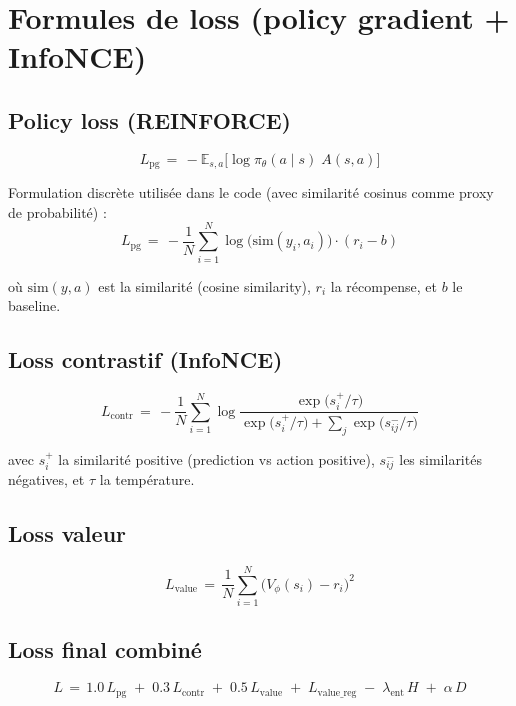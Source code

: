 \documentclass[a4paper,11pt]{article}
\begin{document}
\section*{Formules de loss (policy gradient + InfoNCE)}

\subsection*{Policy loss (REINFORCE)}
\begin{equation}
L_{\text{pg}} \,=\, -\mathbb{E}_{s,a}\big[\log \pi_{\theta}(a\mid s)\; A(s,a)\big]
\end{equation}

Formulation discrète utilisée dans le code (avec similarité cosinus comme proxy de probabilité) :
\begin{equation}
L_{\text{pg}} \,=\, -\frac{1}{N}\sum_{i=1}^{N} \log\big(\mathrm{sim}(y_i,a_i)\big)\cdot (r_i - b)
\end{equation}

où $\mathrm{sim}(y,a)$ est la similarité (cosine similarity), $r_i$ la récompense, et $b$ le baseline.

\subsection*{Loss contrastif (InfoNCE)}
\begin{equation}
L_{\text{contr}} \,=\, -\frac{1}{N}\sum_{i=1}^{N} \log\frac{\exp\big(s_{i}^{+}/\tau\big)}{\exp\big(s_{i}^{+}/\tau\big) + \sum_{j}\exp\big(s_{ij}^{-}/\tau\big)}
\end{equation}

avec $s_{i}^{+}$ la similarité positive (prediction vs action positive), $s_{ij}^{-}$ les similarités négatives, et $\tau$ la température.

\subsection*{Loss valeur}
\begin{equation}
L_{\text{value}} \,=\, \frac{1}{N}\sum_{i=1}^{N} \big(V_{\phi}(s_i) - r_i\big)^2
\end{equation}

\subsection*{Loss final combiné}
\begin{equation}
L \,=\, 1.0\,L_{\text{pg}} \; + \; 0.3\,L_{\text{contr}} \; + \; 0.5\,L_{\text{value}} \; + \; L_{\text{value\_reg}} \; - \; \lambda_{\text{ent}}\,H \; + \; \alpha\,D
\end{equation}
\end{document}
